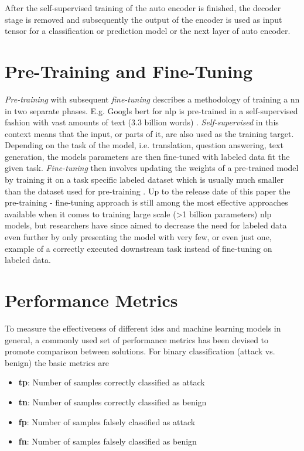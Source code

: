 After the self-supervised training of the auto encoder is finished, the decoder stage is removed and subsequently the output of the encoder is used as input tensor for a classification or prediction model or the next layer of auto encoder. 

\section{Pre-Training and Fine-Tuning}

\textit{Pre-training} with subsequent \textit{fine-tuning} describes a methodology of training a \gls{nn} in two separate phases. E.g. Googls \gls{bert} for \gls{nlp} is pre-trained in a self-supervised fashion with vast amounts of text (3.3 billion words) \cite{bert}. \textit{Self-supervised} in this context means that the input, or parts of it, are also used as the training target. Depending on the task of the model, i.e. translation, question answering, text generation, the models parameters are then fine-tuned with labeled data fit the given task. \textit{Fine-tuning} then involves updating the weights of a pre-trained model by training it on a task specific labeled dataset which is usually much smaller than the dataset used for pre-training \cite{gpt3}. Up to the release date of this paper the pre-training - fine-tuning approach is still among the most effective approaches available when it comes to training large scale (>1 billion parameters) \gls{nlp} models, but researchers have since aimed to decrease the need for labeled data even further by only presenting the model with very few, or even just one, example of a correctly executed downstream task \cite{gpt3} instead of fine-tuning on labeled data.

\section{Performance Metrics} \label{sec:background:metrics}

To measure the effectiveness of different \glspl{ids} and machine learning models in general, a commonly used set of performance metrics has been devised to promote comparison between solutions. For binary classification (attack vs. benign) the basic metrics are

\begin{itemize}
	\item \textbf{\gls{tp}}: Number of samples correctly classified as attack
	\item \textbf{\gls{tn}}: Number of samples correctly classified as benign
	\item \textbf{\gls{fp}}: Number of samples falsely classified as attack
	\item \textbf{\gls{fn}}: Number of samples falsely classified as benign
\end{itemize}

